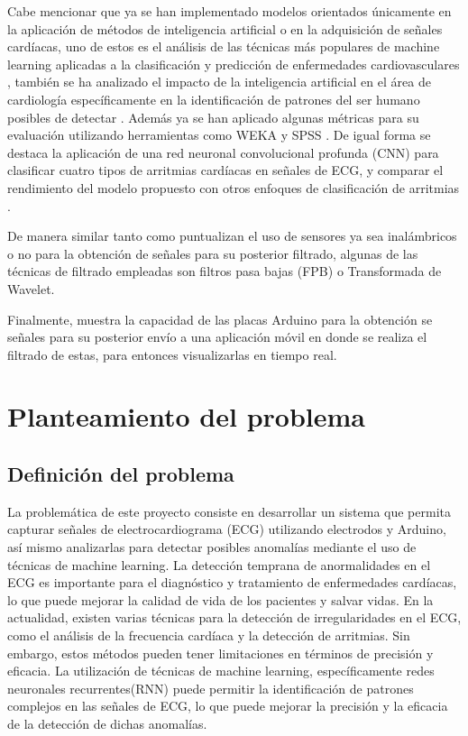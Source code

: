 Cabe mencionar que ya se han implementado modelos orientados únicamente en la aplicación de métodos de inteligencia artificial o en la adquisición de señales cardíacas, uno de estos es el análisis de las técnicas más populares de machine learning aplicadas a la clasificación y predicción de enfermedades cardiovasculares \citep{bib6}, también se ha analizado el impacto de la inteligencia artificial en el área de cardiología específicamente en la identificación de patrones del ser humano posibles de detectar \citep{bib4}. Además ya se han aplicado algunas métricas para su evaluación utilizando herramientas como WEKA y SPSS \citep{bib5}. De igual forma se destaca la aplicación de una red neuronal convolucional profunda (CNN) para clasificar cuatro tipos de arritmias cardíacas en señales de ECG, y comparar el rendimiento del modelo propuesto con otros enfoques de clasificación de arritmias \citep{bib11}.

De manera similar tanto \citep{bib3} como \citep{bib9} puntualizan el uso de sensores ya sea inalámbricos o no para la obtención de señales para su posterior filtrado, algunas de las técnicas de filtrado empleadas son filtros pasa bajas (FPB) o Transformada de Wavelet.

Finalmente, \citep{bib10} muestra la capacidad de las placas Arduino para la obtención se señales para su posterior envío a una aplicación móvil en donde se realiza el filtrado de estas, para entonces visualizarlas en tiempo real. 

\section{Planteamiento del problema}
\label{sec:planteamiento}
\subsection{Definición del problema}

La problemática de este proyecto consiste en desarrollar un sistema que permita capturar señales de electrocardiograma (ECG) utilizando electrodos y Arduino, así mismo analizarlas para detectar posibles anomalías mediante el uso de técnicas de machine learning. 
La detección temprana de anormalidades en el ECG es importante para el diagnóstico y tratamiento de enfermedades cardíacas, lo que puede mejorar la calidad de vida de los pacientes y salvar vidas.
En la actualidad, existen varias técnicas para la detección de irregularidades en el ECG, como el análisis de la frecuencia cardíaca y la detección de arritmias. 
Sin embargo, estos métodos pueden tener limitaciones en términos de precisión y eficacia. La utilización de técnicas de machine learning, específicamente redes neuronales recurrentes(RNN) puede permitir la identificación de patrones complejos en las señales de ECG,
lo que puede mejorar la precisión y la eficacia de la detección de dichas anomalías.\\

